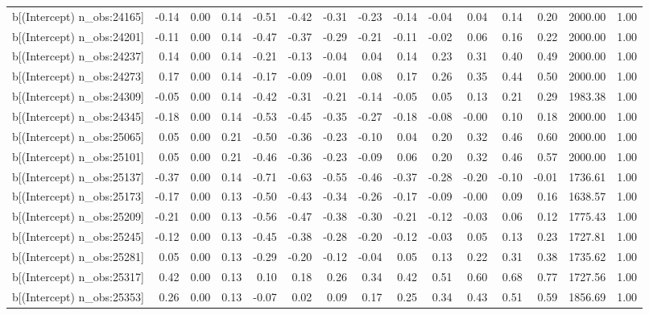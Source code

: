 \begin{table}[ht]
\begin{tabular}{rrrrrrrrrrrrrrr}
  b[(Intercept) n\_obs:24165] & -0.14 & 0.00 & 0.14 & -0.51 & -0.42 & -0.31 & -0.23 & -0.14 & -0.04 & 0.04 & 0.14 & 0.20 & 2000.00 & 1.00 \\ 
  b[(Intercept) n\_obs:24201] & -0.11 & 0.00 & 0.14 & -0.47 & -0.37 & -0.29 & -0.21 & -0.11 & -0.02 & 0.06 & 0.16 & 0.22 & 2000.00 & 1.00 \\ 
  b[(Intercept) n\_obs:24237] & 0.14 & 0.00 & 0.14 & -0.21 & -0.13 & -0.04 & 0.04 & 0.14 & 0.23 & 0.31 & 0.40 & 0.49 & 2000.00 & 1.00 \\ 
  b[(Intercept) n\_obs:24273] & 0.17 & 0.00 & 0.14 & -0.17 & -0.09 & -0.01 & 0.08 & 0.17 & 0.26 & 0.35 & 0.44 & 0.50 & 2000.00 & 1.00 \\ 
  b[(Intercept) n\_obs:24309] & -0.05 & 0.00 & 0.14 & -0.42 & -0.31 & -0.21 & -0.14 & -0.05 & 0.05 & 0.13 & 0.21 & 0.29 & 1983.38 & 1.00 \\ 
  b[(Intercept) n\_obs:24345] & -0.18 & 0.00 & 0.14 & -0.53 & -0.45 & -0.35 & -0.27 & -0.18 & -0.08 & -0.00 & 0.10 & 0.18 & 2000.00 & 1.00 \\ 
  b[(Intercept) n\_obs:25065] & 0.05 & 0.00 & 0.21 & -0.50 & -0.36 & -0.23 & -0.10 & 0.04 & 0.20 & 0.32 & 0.46 & 0.60 & 2000.00 & 1.00 \\ 
  b[(Intercept) n\_obs:25101] & 0.05 & 0.00 & 0.21 & -0.46 & -0.36 & -0.23 & -0.09 & 0.06 & 0.20 & 0.32 & 0.46 & 0.57 & 2000.00 & 1.00 \\ 
  b[(Intercept) n\_obs:25137] & -0.37 & 0.00 & 0.14 & -0.71 & -0.63 & -0.55 & -0.46 & -0.37 & -0.28 & -0.20 & -0.10 & -0.01 & 1736.61 & 1.00 \\ 
  b[(Intercept) n\_obs:25173] & -0.17 & 0.00 & 0.13 & -0.50 & -0.43 & -0.34 & -0.26 & -0.17 & -0.09 & -0.00 & 0.09 & 0.16 & 1638.57 & 1.00 \\ 
  b[(Intercept) n\_obs:25209] & -0.21 & 0.00 & 0.13 & -0.56 & -0.47 & -0.38 & -0.30 & -0.21 & -0.12 & -0.03 & 0.06 & 0.12 & 1775.43 & 1.00 \\ 
  b[(Intercept) n\_obs:25245] & -0.12 & 0.00 & 0.13 & -0.45 & -0.38 & -0.28 & -0.20 & -0.12 & -0.03 & 0.05 & 0.13 & 0.23 & 1727.81 & 1.00 \\ 
  b[(Intercept) n\_obs:25281] & 0.05 & 0.00 & 0.13 & -0.29 & -0.20 & -0.12 & -0.04 & 0.05 & 0.13 & 0.22 & 0.31 & 0.38 & 1735.62 & 1.00 \\ 
  b[(Intercept) n\_obs:25317] & 0.42 & 0.00 & 0.13 & 0.10 & 0.18 & 0.26 & 0.34 & 0.42 & 0.51 & 0.60 & 0.68 & 0.77 & 1727.56 & 1.00 \\ 
  b[(Intercept) n\_obs:25353] & 0.26 & 0.00 & 0.13 & -0.07 & 0.02 & 0.09 & 0.17 & 0.25 & 0.34 & 0.43 & 0.51 & 0.59 & 1856.69 & 1.00 \\ 

\end{tabular}
\end{table}
